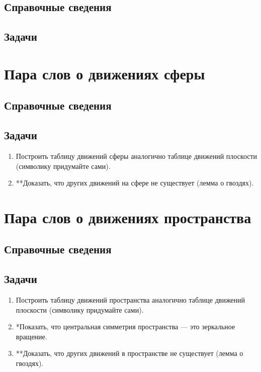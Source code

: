 \subsection*{Справочные сведения}

\subsection*{Задачи}




\section{Пара слов о движениях сферы}

\subsection*{Справочные сведения}

\subsection*{Задачи}

\begin{enumerate}
\item Построить таблицу движений сферы аналогично таблице движений плоскости (символику придумайте сами).
\item **Доказать, что других движений на сфере не существует (лемма о гвоздях).
\end{enumerate}


\section{Пара слов о движениях пространства}

\subsection*{Справочные сведения}

\subsection*{Задачи}

\begin{enumerate}
\item Построить таблицу движений пространства аналогично таблице движений плоскости (символику придумайте сами).
\item *Показать, что центральная симметрия пространства --- это зеркальное вращение.
\item **Доказать, что других движений в пространстве не существует (лемма о гвоздях).
\end{enumerate}



